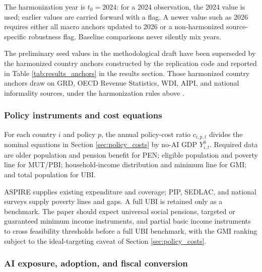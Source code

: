 \documentclass[11pt,a4paper]{article}
\begin{document}
The harmonization year is $t_0=2024$: for a 2024 observation, the 2024 value is used; earlier values are carried forward with a flag. A newer value such as 2026 requires either all macro anchors updated to 2026 or a non-harmonized source-specific robustness flag. Baseline comparisons never silently mix years.

The preliminary seed values in the methodological draft have been superseded by the harmonized country anchors constructed by the replication code and reported in Table \ref{tab:results_anchors} in the results section. Those harmonized country anchors draw on GRD, OECD Revenue Statistics, WDI, AIPI, and national informality sources, under the harmonization rules above \citep{imf2024aipi,worldbank2026wdi,oecd2025revenue,oecd2025peru,worldbank2026humancapital,inechile2025ene,dane2026informalidad,inegi2024enoe}.

\subsubsection{Policy instruments and cost equations}

For each country $i$ and policy $p$, the annual policy-cost ratio $c_{i,p,t}$ divides the nominal equations in Section \ref{sec:policy_costs} by no-AI GDP $Y^0_{i,t}$. Required data are older population and pension benefit for PEN; eligible population and poverty line for MUT/PBI; household-income distribution and minimum line for GMI; and total population for UBI.

ASPIRE supplies existing expenditure and coverage; PIP, SEDLAC, and national surveys supply poverty lines and gaps. A full UBI is retained only as a benchmark. The paper should expect universal social pensions, targeted or guaranteed minimum income instruments, and partial basic income instruments to cross feasibility thresholds before a full UBI benchmark, with the GMI ranking subject to the ideal-targeting caveat of Section \ref{sec:policy_costs}.

\subsubsection{AI exposure, adoption, and fiscal conversion}
\end{document}
